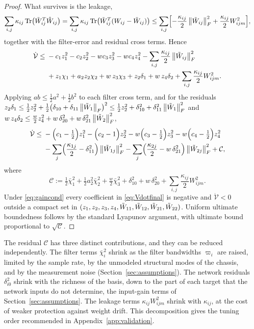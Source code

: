 \begin{proof}
What survives is the leakage,
\[
\sum_{i,j}\kappa_{ij}\operatorname{Tr}\bigl(\tilde{W}_{ij}^T\hat{W}_{ij}\bigr)
=\sum_{i,j}\kappa_{ij}\operatorname{Tr}\bigl(\tilde{W}_{ij}^T(W_{ij}-\tilde{W}_{ij})\bigr)
\le\sum_{i,j}\Bigl[-\frac{\kappa_{ij}}{2}\left\lVert \tilde{W}_{ij} \right\rVert_F^2
+\frac{\kappa_{ij}}{2}W_{ijm}^2\Bigr],
\]
together with the filter-error and residual cross terms. Hence
\[
\begin{aligned}
\dot{\mathcal{V}}\le{}&
-c_1z_1^2-c_2z_2^2-wc_3z_3^2-wc_4z_4^2
-\sum_{i,j}\frac{\kappa_{ij}}{2}\left\lVert \tilde{W}_{ij} \right\rVert_F^2\\
&+z_1\chi_1+a_2z_2\chi_2+w\,z_3\chi_3+z_2\delta_1+w\,z_4\delta_2
+\sum_{i,j}\frac{\kappa_{ij}}{2}W_{ijm}^2 .
\end{aligned}
\]
Applying $ab\le\tfrac12a^2+\tfrac12b^2$ to each filter cross term, and for the
residuals
$z_2\delta_1\le\tfrac12z_2^2+\tfrac12\bigl(\delta_{10}+\delta_{11}\left\lVert \tilde{W}_1 \right\rVert_F\bigr)^2
\le\tfrac12z_2^2+\delta_{10}^2+\delta_{11}^2\left\lVert \tilde{W}_1 \right\rVert_F^2$ and
$w\,z_4\delta_2\le\tfrac{w}{2}z_4^2+w\,\delta_{20}^2+w\,\delta_{21}^2\left\lVert \tilde{W}_2 \right\rVert_F^2$,
\begin{equation}\label{eq:Vdotfinal}
\begin{aligned}
\dot{\mathcal{V}}\le{}&
-\Bigl(c_1-\tfrac12\Bigr)z_1^2
-\Bigl(c_2-1\Bigr)z_2^2
-w\Bigl(c_3-\tfrac12\Bigr)z_3^2
-w\Bigl(c_4-\tfrac12\Bigr)z_4^2\\
&-\sum_{j}\Bigl(\frac{\kappa_{1j}}{2}-\delta_{11}^2\Bigr)\left\lVert \tilde{W}_{1j} \right\rVert_F^2
-\sum_{j}\Bigl(\frac{\kappa_{2j}}{2}-w\,\delta_{21}^2\Bigr)\left\lVert \tilde{W}_{2j} \right\rVert_F^2
+\mathcal{C},
\end{aligned}
\end{equation}
where
\[
\mathcal{C}:=\tfrac12\bar\chi_1^2+\tfrac12a_2^2\bar\chi_2^2
+\tfrac{w}{2}\bar\chi_3^2+\delta_{10}^2+w\,\delta_{20}^2
+\sum_{i,j}\frac{\kappa_{ij}}{2}W_{ijm}^2 .
\]
Under \eqref{eq:gaincond} every coefficient in \eqref{eq:Vdotfinal} is
negative and $\dot{\mathcal{V}}<0$ outside a compact set in
$(z_1,z_2,z_3,z_4,\tilde{W}_{11},\tilde{W}_{12},\tilde{W}_{21},\tilde{W}_{22})$. Uniform ultimate
boundedness follows by the standard Lyapunov argument, with ultimate bound
proportional to $\sqrt{\mathcal{C}}$.
\end{proof}

\begin{remark}
The residual $\mathcal{C}$ has three distinct contributions, and they can be
reduced independently. The filter terms $\bar\chi_i^2$ shrink as the filter
bandwidths $\varpi_i$ are raised, limited by the sample rate, by the
unmodeled structural modes of the chassis, and by the measurement noise
(Section~\ref{sec:assumptions}). The network residuals $\delta_{i0}^2$ shrink with
the richness of the basis, down to the part of each target that the network
inputs do not determine, the input-gain terms of
Section~\ref{sec:assumptions}. The leakage terms $\kappa_{ij}W_{ijm}^2$ shrink with
$\kappa_{ij}$, at the cost of weaker protection against weight drift. This
decomposition gives the tuning order recommended in
Appendix~\ref{app:validation}.
\end{remark}

